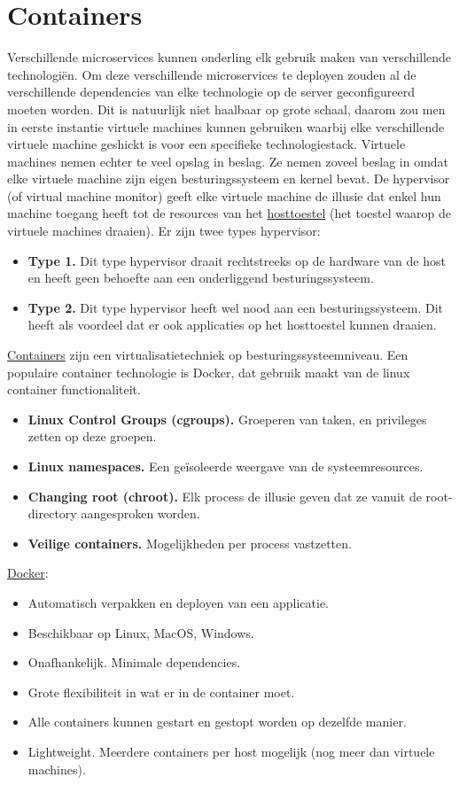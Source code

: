 \documentclass{report}
\begin{document}
	\chapter{Containers}
	Verschillende microservices kunnen onderling elk gebruik maken van verschillende technologiën. Om deze verschillende microservices te deployen zouden al de verschillende dependencies van elke technologie op de server geconfigureerd moeten worden. Dit is natuurlijk niet haalbaar op grote schaal, daarom zou men in eerste instantie virtuele machines kunnen gebruiken waarbij elke verschillende virtuele machine geshickt is voor een specifieke technologiestack. Virtuele machines nemen echter te veel opslag in beslag. Ze nemen zoveel beslag in omdat elke virtuele machine zijn eigen besturingssysteem en kernel bevat. De hypervisor (of virtual machine monitor) geeft elke virtuele machine de illusie dat enkel hun machine toegang heeft tot de resources van het \underline{hosttoestel} (het toestel waarop de virtuele machines draaien). 
	Er zijn twee types hypervisor:
	\begin{itemize}
		\item \textbf{Type 1.} Dit type hypervisor draait rechtstreeks op de hardware van de host en heeft geen behoefte aan een onderliggend besturingssysteem. 
		\item \textbf{Type 2.} Dit type hypervisor heeft wel nood aan een besturingssysteem. Dit heeft als voordeel dat er ook applicaties op het hosttoestel kunnen draaien.
	\end{itemize}
	\underline{Containers} zijn een virtualisatietechniek op besturingssysteemniveau. Een populaire container technologie is Docker, dat gebruik maakt van de linux container functionaliteit.  
	\begin{itemize}
		\item \textbf{Linux Control Groups (cgroups).} Groeperen van taken, en privileges zetten op deze groepen.
		\item \textbf{Linux namespaces.} Een geïsoleerde weergave van de systeemresources.
		\item \textbf{Changing root (chroot).} Elk process de illusie geven dat ze vanuit de root-directory aangesproken worden.
		\item \textbf{Veilige containers.} Mogelijkheden per process vastzetten.
	\end{itemize}

	\underline{Docker}:
	\begin{itemize}
		\item Automatisch verpakken en deployen van een applicatie.
		\item Beschikbaar op Linux, MacOS, Windows.
		\item Onafhankelijk. Minimale dependencies.
		\item Grote flexibiliteit in wat er in de container moet.
		\item Alle containers kunnen gestart en gestopt worden op dezelfde manier.
		\item Lightweight. Meerdere containers per host mogelijk (nog meer dan virtuele machines).
	\end{itemize}
\end{document}
